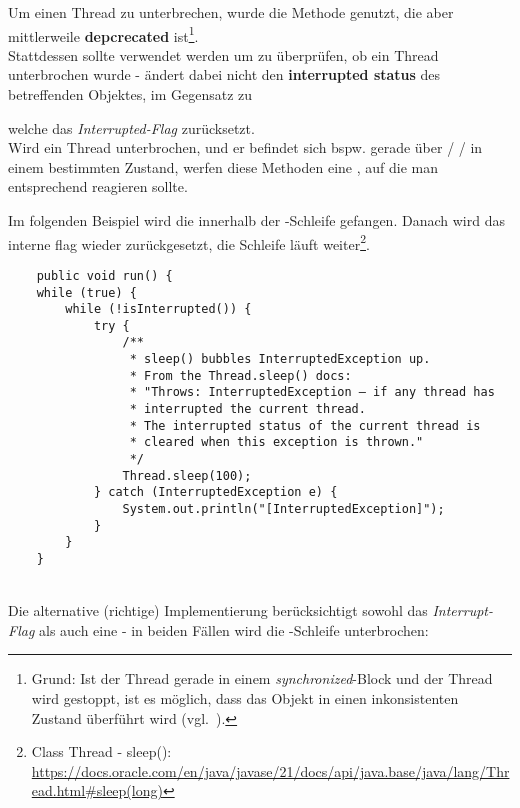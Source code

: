 Um einen Thread zu unterbrechen, wurde die Methode  genutzt, die aber mittlerweile \textbf{depcrecated} ist\footnote{
Grund: Ist der Thread gerade in einem \textit{synchronized}-Block und der Thread wird gestoppt, ist es möglich, dass das Objekt in einen inkonsistenten Zustand überführt wird (vgl.~\cite[40]{Oec22}).
}.\\
Stattdessen sollte  verwendet werden um zu überprüfen, ob ein Thread unterbrochen wurde -  ändert dabei nicht den \textbf{interrupted status} des betreffenden Objektes, im Gegensatz zu
\begin{center}
\end{center}
welche das \textit{Interrupted-Flag} zurücksetzt.\\

Wird ein Thread unterbrochen, und er befindet sich bspw. gerade über  /  /  in einem bestimmten Zustand, werfen diese Methoden eine , auf die man entsprechend reagieren sollte.

\newpage

Im folgenden Beispiel wird die  innerhalb der -Schleife gefangen. Danach wird
das interne flag wieder zurückgesetzt, die Schleife läuft weiter\footnote{
    Class Thread - sleep(): \url{https://docs.oracle.com/en/java/javase/21/docs/api/java.base/java/lang/Thread.html#sleep(long)}
}.
\begin{verbatim}
    public void run() {
    while (true) {
        while (!isInterrupted()) {
            try {
                /**
                 * sleep() bubbles InterruptedException up.
                 * From the Thread.sleep() docs:
                 * "Throws: InterruptedException – if any thread has
                 * interrupted the current thread.
                 * The interrupted status of the current thread is
                 * cleared when this exception is thrown."
                 */
                Thread.sleep(100);
            } catch (InterruptedException e) {
                System.out.println("[InterruptedException]");
            }
        }
    }
\end{verbatim}\\

Die alternative (richtige) Implementierung berücksichtigt sowohl das \textit{Interrupt-Flag} als auch eine  - in beiden Fällen wird die -Schleife unterbrochen:

